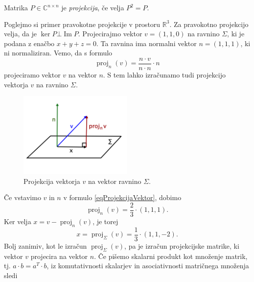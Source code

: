 \documentclass[mat1]{fmfdelo}
\newcommand{\R}{\mathbb R}
\newcommand{\C}{\mathbb C}
\DeclareMathOperator{\Ima}{Im}
\begin{document}
\begin{definicija}
    Matrika $P \in \C^{n \times n}$ je \emph{projekcija}, če velja $P^2 = P$.
\end{definicija}
\begin{zgled}
    Poglejmo si primer pravokotne projekcije v prostoru $\R^3$. Za pravokotno projekcijo velja, da je $\ker P \bot \Ima P$. Projecirajmo vektor $v = (1,1,0)$ na ravnino $\Sigma$, ki je podana z enačbo $x + y + z = 0$. Ta ravnina ima normalni vektor $n = (1,1,1)$, ki ni normaliziran. Vemo, da s formulo
    \begin{equation}\label{eqProjekcijaVektor}
        \operatorname{proj}_{n}(v) = \frac{n \cdot v}{n\cdot n}\cdot n
    \end{equation}
    projeciramo vektor $v$ na vektor $n$. S tem lahko izračunamo tudi projekcijo vektorja $v$ na ravnino $\Sigma$.
    \begin{figure}[H]
        \vspace{-10pt}
        \centering
        \includegraphics[width=0.5\textwidth]{projekcija.png}
        \vspace{-25pt}
        \caption{Projekcija vektorja $v$ na vektor ravnino $\Sigma$.}
    \end{figure}
    Če vstavimo $v$ in $n$ v formulo \eqref{eqProjekcijaVektor}, dobimo
    \begin{equation}
        \operatorname{proj}_{n}(v) = \frac{2}{3}\cdot (1,1,1).
    \end{equation}
    Ker velja $x = v - \operatorname{proj}_{n}(v)$, je torej
    \begin{equation}
        x = \operatorname{proj}_\Sigma (v) = \frac{1}{3}\cdot (1,1,-2).
    \end{equation}
    Bolj zanimiv, kot le izračun $\operatorname{proj}_\Sigma (v)$, pa je izračun projekcijske matrike, ki vektor $v$ projecira na vektor $n$. Če pišemo skalarni produkt kot množenje matrik, tj. $a\cdot b = a^T \cdot b$, iz komutativnosti skalarjev in asociativnosti matričnega množenja sledi
    \begin{equation}

\end{equation}
\end{zgled}
\end{document}
